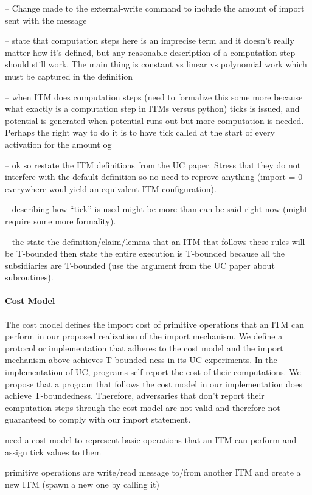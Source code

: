 -- Change made to the external-write command to include the amount of import sent with the message

-- state that computation steps here is an imprecise term and it doesn't really matter how it's defined, but any reasonable description of a computation step should still work. The main thing is constant vs linear vs polynomial work which must be captured in the definition

-- when ITM does computation steps (need to formalize this some more because what exactly is a computation step in ITMs versus python) ticks is issued, and potential is generated when potential runs out but more computation is needed. Perhaps the right way to do it is to have tick called at the start of every activation for the amount og 

-- ok so restate the ITM definitions from the UC paper. Stress that they do not interfere with the default definition so no need to reprove anything (import = 0 everywhere woul yield an equivalent ITM configuration).

-- describing how ``tick'' is used might be more than can be said right now (might require some more formality).

-- the state the definition/claim/lemma that an ITM that follows these rules will be T-bounded then state the entire execution is T-bounded because all the subsidiaries are T-bounded (use the argument from the UC paper about subroutines).


\paragraph{Cost Model}
The cost model defines the import cost of primitive operations that an ITM can perform in our proposed realization of the import mechanism.
We define a protocol or implementation that adheres to the cost model and the import mechanism above achieves T-bounded-ness in its UC experiments.
In the implementation of UC, programs self report the cost of their computations. 
We propose that a program that follows the cost model in our implementation does achieve T-boundedness.
Therefore, adversaries that don't report their computation steps through the cost model are not valid and therefore not guaranteed to comply with our import statement.


need a cost model to represent basic operations that an ITM can perform and assign tick values to them

primitive operations are write/read message to/from another ITM and create a new ITM (spawn a new one by calling it)

